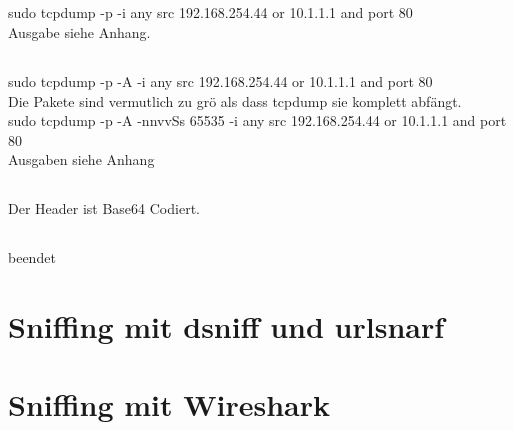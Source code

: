 \documentclass[12pt]{article}
\theoremstyle{plain}
\begin{document}
\subsection{}
sudo tcpdump -p -i any src 192.168.254.44 or 10.1.1.1 and port 80\\
Ausgabe siehe Anhang.
\subsection{}
sudo tcpdump -p -A -i any src 192.168.254.44 or 10.1.1.1 and port 80\\
Die Pakete sind vermutlich zu grö als dass tcpdump sie komplett abfängt.\\
sudo tcpdump -p -A -nnvvSs 65535 -i any src 192.168.254.44 or 10.1.1.1 and port 80\\
Ausgaben siehe Anhang
\subsection{}
Der Header ist Base64 Codiert. 
\subsection{}
beendet
\section{Sniffing mit dsniff und urlsnarf}
\subsection{}
\subsection{}
\section{Sniffing mit Wireshark}
\subsection{}
\subsection{}
\subsection{}
\subsection{}
\end{document}
